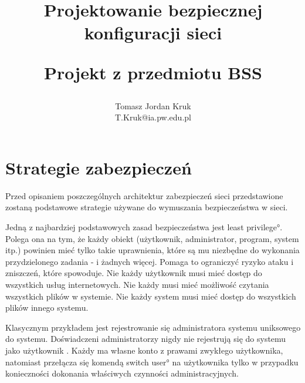 

\title{Projektowanie bezpiecznej konfiguracji sieci\\
\begin{small}
Projekt z przedmiotu BSS
\end{small}}

\author{Tomasz Jordan Kruk\\ T.Kruk@ia.pw.edu.pl}

\maketitle
\tableofcontents




\section{Strategie zabezpieczeń}

Przed opisaniem poszczególnych architektur zabezpieczeń sieci przedstawione
zostaną podstawowe strategie używane do wymuszania bezpieczeństwa w sieci.

Jedną z najbardziej podstawowych zasad bezpieczeństwa jest  \ang{least privilege}. Polega ona na tym, że każdy
obiekt (użytkownik, administrator, program, system itp.) powinien mieć tylko
takie uprawnienia, które są mu niezbędne do wykonania przydzielonego zadania
- i żadnych więcej. Pomaga to ograniczyć ryzyko ataku i zniszczeń, które
spowoduje. Nie każdy użytkownik musi mieć dostęp do wszystkich usług
internetowych. Nie każdy musi mieć możliwość czytania wszystkich plików w
systemie. Nie każdy system musi mieć dostęp do wszystkich plików innego
systemu.

Klasycznym przykładem jest rejestrowanie się administratora systemu
uniksowego do systemu. Doświadczeni administratorzy nigdy nie rejestrują się
do systemu jako użytkownik . Każdy ma własne konto z prawami
zwykłego użytkownika, natomiast przełącza się komendą  \ang{switch
user} na użytkownika  tylko w przypadku konieczności dokonania
właściwych czynności administracyjnych.

